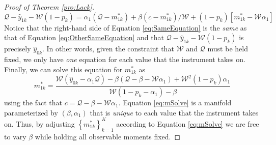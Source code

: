 \begin{proof}[Proof of Theorem \ref{pro:Lack}]
\begin{equation}
  \mathcal{Q} - \hat{y}_{1k} - \mathcal{W}(1-p_k) = \alpha_1 (\mathcal{Q} - m^*_{1k}) + \beta(c-m^*_{1k})/\mathcal{W} + (1-p_k)\left[m^*_{1k} - \mathcal{W}\alpha_1\right]
  \label{eq:SameEquation}
\end{equation}
Notice that the right-hand side of Equation \ref{eq:SameEquation} is the \emph{same} as that of Equation \ref{eq:OtherSameEquation} and that $\mathcal{Q} - \hat{y}_{1k} - \mathcal{W}(1-p_k)$ is precisely $\hat{y}_{0k}$.
In other words, given the constraint that $\mathcal{W}$ and $\mathcal{Q}$ must be held fixed, we only have \emph{one} equation for each value that the instrument takes on.
Finally, we can solve this equation for $m^*_{1k}$ as
\begin{equation}
  m^*_{1k} = \frac{\mathcal{W}(\hat{y}_{0k}-\alpha_1 \mathcal{Q}) - \beta(\mathcal{Q}-\beta-\mathcal{W}\alpha_1) + \mathcal{W}^2(1-p_k)\alpha_1}{\mathcal{W}(1-p_k - \alpha_1) - \beta}
  \label{eq:mSolve}
\end{equation}
using the fact that $c = \mathcal{Q} - \beta - \mathcal{W}\alpha_1$.
Equation \ref{eq:mSolve} is a manifold parameterized by $(\beta,\alpha_1)$ that is \emph{unique} to each value that the instrument takes on. 
Thus, by adjusting $\left\{ m^*_{1k} \right\}_{k=1}^K$ according to Equation \ref{eq:mSolve} we are free to vary $\beta$ while holding all observable moments fixed. 
\end{proof}


